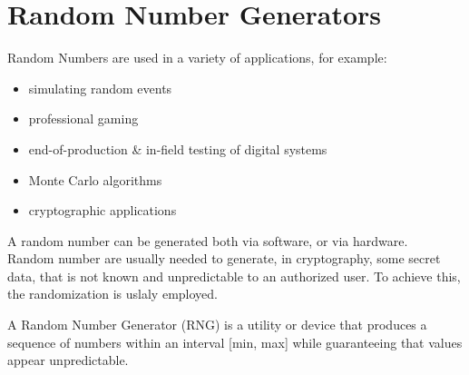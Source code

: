 \chapter{Random Number Generators}
Random Numbers are used in a variety of applications, for example:
\begin{itemize}
  \item simulating random events
  \item professional gaming
  \item end-of-production & in-field testing of digital systems
  \item Monte Carlo algorithms
  \item cryptographic applications
\end{itemize}
A random number can be generated both via software, or via hardware.\\
Random number are usually needed to generate, in cryptography, some secret data, that is not known 
and unpredictable to an authorized user. To achieve this, the randomization is uslaly employed.\\

\begin{boxH}
  A Random Number Generator (RNG) is a utility or device that produces a sequence of numbers 
  within an interval [min, max] while guaranteeing that values appear unpredictable.
\end{boxH}

